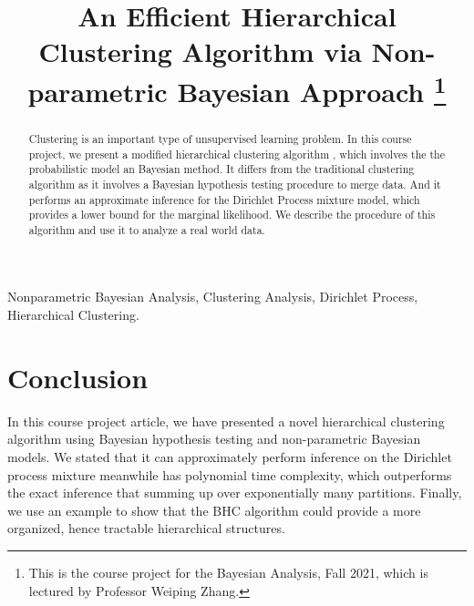 \documentclass[]{interact}
\theoremstyle{plain}%
\theoremstyle{definition}
\theoremstyle{remark}
\begin{document}

\title{An Efficient Hierarchical Clustering Algorithm via Non-parametric Bayesian Approach \footnote{This is the course project for the Bayesian Analysis, Fall 2021, which is lectured by Professor Weiping Zhang.}}

\author{
}

\maketitle

\begin{abstract}
Clustering is an important type of unsupervised learning problem. In this course project, we present a modified hierarchical clustering algorithm \cite{bhc}, which involves the the probabilistic model an Bayesian method. It differs from the traditional clustering algorithm as it involves a Bayesian hypothesis testing procedure to merge data. And it performs an approximate inference for the Dirichlet Process mixture model, which provides a lower bound for the marginal likelihood. We describe the procedure of this algorithm and use it to analyze a real world data.
\end{abstract}
\begin{keywords}
Nonparametric Bayesian Analysis, Clustering Analysis, Dirichlet Process, Hierarchical Clustering.
\end{keywords}



\section{Conclusion}

In this course project article, we have presented a novel hierarchical clustering algorithm using Bayesian hypothesis testing and non-parametric Bayesian models. We stated that it can approximately perform inference on the Dirichlet process mixture meanwhile has polynomial time complexity, which outperforms the exact inference that summing up over exponentially many partitions. Finally, we use an example to show that the BHC algorithm could provide a more organized, hence tractable hierarchical structures.



\appendix


\end{document}
